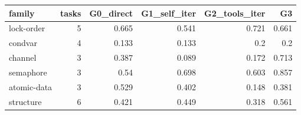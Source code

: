 \begin{tabular}{lrrrrr}
\toprule
family & tasks & G0\_direct & G1\_self\_iter & G2\_tools\_iter & G3 \\
\midrule
lock-order & 5 & 0.665 & 0.541 & 0.721 & 0.661 \\
condvar & 4 & 0.133 & 0.133 & 0.2 & 0.2 \\
channel & 3 & 0.387 & 0.089 & 0.172 & 0.713 \\
semaphore & 3 & 0.54 & 0.698 & 0.603 & 0.857 \\
atomic-data & 3 & 0.529 & 0.402 & 0.148 & 0.381 \\
structure & 6 & 0.421 & 0.449 & 0.318 & 0.561 \\
\bottomrule
\end{tabular}
